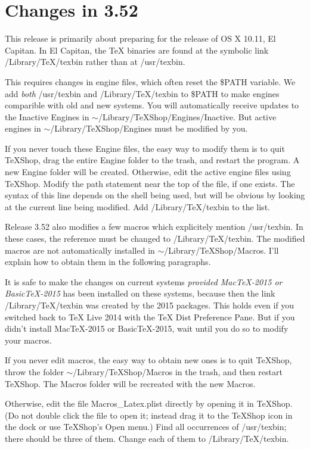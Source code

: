 \documentclass[11pt, oneside]{amsart}
\begin{document}
\section{Changes in 3.52}


This release is primarily about preparing for the release of OS X 10.11, El Capitan. In El Capitan, the TeX binaries are found at the symbolic link /Library/TeX/texbin rather than at /usr/texbin.

This requires changes in engine files, which often reset the \$PATH variable. We add {\em both}
/usr/texbin and /Library/TeX/texbin to \$PATH to make engines comparible with old and new systems. You will automatically receive updates to the Inactive Engines in $\sim$/Library/TeXShop/Engines/Inactive. But active engines in $\sim$/Library/TeXShop/Engines must be modified
by you.

If you never touch these Engine files, the easy way to modify them is to quit TeXShop, drag the entire Engine folder to the trash, and restart the program. A new Engine folder will be created. Otherwise,  edit the active engine files using TeXShop. Modify the path statement near the top of the file, if one exists. The syntax of this line depends on the shell being used, but will be obvious by looking at the current line being modified. Add /Library/TeX/texbin to the list.

Release 3.52 also modifies a few macros which explicitely mention /usr/texbin. In these cases, the reference must be changed to /Library/TeX/texbin. The modified macros are not automatically
installed in $\sim$/Library/TeXShop/Macros.  I'll explain  how to obtain them in the
following paragraphs.

It is safe to make the changes on current systems {\em provided MacTeX-2015 or BasicTeX-2015}
has been installed on these systems, because then the link /Library/TeX/texbin was created by
the 2015 packages. This holds even if you  switched back to TeX Live 2014 with the
TeX Dist Preference Pane. But if you didn't install MacTeX-2015 or BasicTeX-2015, wait until you do so to modify your macros.

If you never edit macros, the easy way to obtain new ones is to quit TeXShop, throw the folder
$\sim$/Library/TeXShop/Macros in the trash, and then restart TeXShop. The Macros folder will be recreated with the new Macros.

Otherwise, edit the file Macros\_Latex.plist directly by opening it in TeXShop. (Do not double
click the file to open it; instead drag it to the TeXShop icon in the dock or use TeXShop's Open menu.)  Find all occurrences of /usr/texbin; there should be three of them.
Change each of them to /Library/TeX/texbin.
\end{document}
